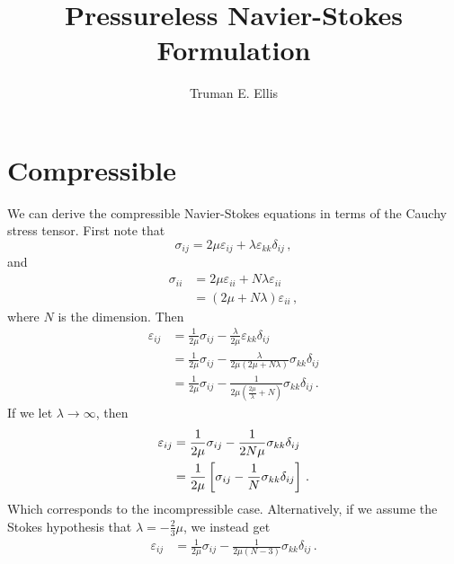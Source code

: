 \documentclass{article}
\author{Truman E. Ellis}
\title{Pressureless Navier-Stokes Formulation}
\begin{document}
\maketitle

\section*{Compressible}
We can derive the compressible Navier-Stokes equations in terms of the Cauchy stress tensor.
First note that
\begin{equation*}
  \sigma_{ij}=2\mu\varepsilon_{ij}+\lambda\varepsilon_{kk}\delta_{ij}\,,
\end{equation*}
and
\begin{align*}
  \sigma_{ii}&=2\mu\varepsilon_{ii}+N\lambda\varepsilon_{ii}\\
  &=(2\mu+N\lambda)\varepsilon_{ii}\,,
\end{align*}
where $N$ is the dimension.
Then
\begin{align*}
  \varepsilon_{ij}&=\frac{1}{2\mu}\sigma_{ij}-\frac{\lambda}{2\mu}\varepsilon_{kk}\delta_{ij}\\
  &=\frac{1}{2\mu}\sigma_{ij}-\frac{\lambda}{2\mu(2\mu+N\lambda)}\sigma_{kk}\delta_{ij}\\
  &=\frac{1}{2\mu}\sigma_{ij}-\frac{1}{2\mu(\frac{2\mu}{\lambda}+N)}\sigma_{kk}\delta_{ij}\,.
\end{align*}
If we let $\lambda\rightarrow\infty$, then
\begin{align*}
  \varepsilon_{ij}&=\frac{1}{2\mu}\sigma_{ij}-\frac{1}{2N\mu}\sigma_{kk}\delta_{ij}\\
  &=\frac{1}{2\mu}\left[ \sigma_{ij}-\frac{1}{N}\sigma_{kk}\delta_{ij} \right]\,.
\end{align*}
Which corresponds to the incompressible case.
Alternatively, if we assume the Stokes hypothesis that $\lambda=-\frac{2}{3}\mu$, we instead get
\begin{align*}
  \varepsilon_{ij}&=\frac{1}{2\mu}\sigma_{ij}-\frac{1}{2\mu(N-3)}\sigma_{kk}\delta_{ij}\,.
\end{align*}
\end{document}
